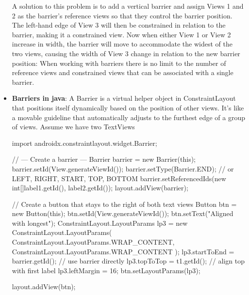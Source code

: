 \documentclass{report}
\begin{document}
\begin{itemize}
            \bigbreak \noindent 
            A solution to this problem is to add a vertical barrier and assign Views 1 and 2 as the barrier’s reference views so that they control the barrier position.
            \bigbreak \noindent 
            The left-hand edge of View 3 will then be constrained in relation to the barrier, making it a constrained view.
            \bigbreak \noindent 
            Now when either View 1 or View 2 increase in width, the barrier will move to accommodate the widest of the two views, causing the width of View 3 change in relation to the new barrier position:
            \bigbreak \noindent 
            \bigbreak \noindent 
            When working with barriers there is no limit to the number of reference views and constrained views that can be associated with a single barrier.
        \item \textbf{Barriers in java}: A Barrier is a virtual helper object in ConstraintLayout that positions itself dynamically based on the position of other views. It’s like a movable guideline that automatically adjusts to the furthest edge of a group of views.
            \bigbreak \noindent 
            Assume we have two TextViews
            \bigbreak \noindent 
            \begin{javacode}
                import androidx.constraintlayout.widget.Barrier;

                // --- Create a barrier ---
                Barrier barrier = new Barrier(this);
                barrier.setId(View.generateViewId());
                barrier.setType(Barrier.END); // or LEFT, RIGHT, START, TOP, BOTTOM
                barrier.setReferencedIds(new int[]{label1.getId(), label2.getId()});
                layout.addView(barrier);

                // Create a button that stays to the right of both text views
                Button btn = new Button(this);
                btn.setId(View.generateViewId());
                btn.setText("Aligned with longest");
                ConstraintLayout.LayoutParams lp3 = new ConstraintLayout.LayoutParams(
                        ConstraintLayout.LayoutParams.WRAP_CONTENT,
                        ConstraintLayout.LayoutParams.WRAP_CONTENT
                );
                lp3.startToEnd = barrier.getId(); // use barrier directly
                lp3.topToTop = t1.getId();       // align top with first label
                lp3.leftMargin = 16;
                btn.setLayoutParams(lp3);

                layout.addView(btn);


\end{javacode}
\end{itemize}
\end{document}
